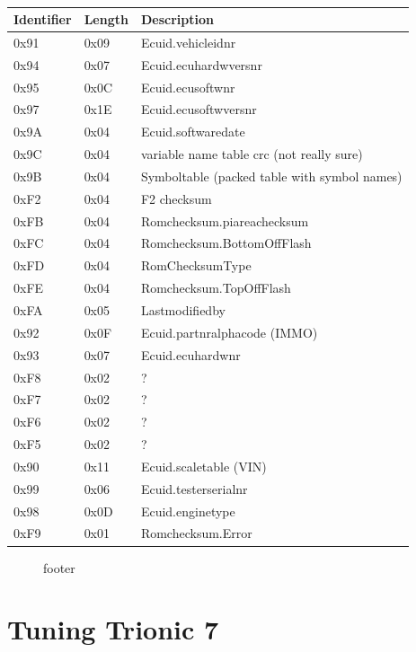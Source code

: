 \documentclass[11pt,a4paper]{book}
\newcommand{\Mfig}[1]{%
\begin{figure}
    \centering
    \missingfigure{#1}
    \caption{#1}
\end{figure}}
\begin{document}
\begin{table}
    \centering
    \begin{tabular}{lll}
        Identifier & Length & Description \\
        \midrule
        0x91& 0x09& Ecuid.vehicleidnr \\
        0x94 & 0x07 & Ecuid.ecuhardwversnr \\
        0x95 & 0x0C & Ecuid.ecusoftwnr \\
        0x97 & 0x1E & Ecuid.ecusoftwversnr \\
        0x9A & 0x04 & Ecuid.softwaredate \\
        0x9C & 0x04 & variable name table crc (not really sure) \\
        0x9B & 0x04 & Symboltable (packed table with symbol names) \\
        0xF2 & 0x04 & F2 checksum \\
        0xFB & 0x04 & Romchecksum.piareachecksum \\
        0xFC & 0x04 & Romchecksum.BottomOffFlash \\
        0xFD & 0x04 & RomChecksumType \\
        0xFE & 0x04 & Romchecksum.TopOffFlash \\
        0xFA & 0x05 & Lastmodifiedby \\
        0x92 & 0x0F & Ecuid.partnralphacode (IMMO) \\
        0x93 & 0x07 & Ecuid.ecuhardwnr \\
        0xF8 & 0x02 & ? \\
        0xF7 & 0x02 & ? \\
        0xF6 & 0x02 & ? \\
        0xF5 & 0x02 & ? \\
        0x90 & 0x11 & Ecuid.scaletable (VIN) \\
        0x99 & 0x06 & Ecuid.testerserialnr \\
        0x98 & 0x0D & Ecuid.enginetype \\
        0xF9 & 0x01 & Romchecksum.Error
    \end{tabular}
    \caption{}
    \label{tab:}
\end{table}
\Mfig{footer}








\chapter{Tuning Trionic 7}
\end{document}
